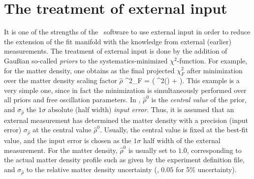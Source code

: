 \section{The treatment of external input}
\label{sec:externalinput}

It is one of the strengths of the \GLOBES\ software to use external input 
in order to reduce the extension of the fit manifold with the knowledge 
from external
(earlier) measurements. The treatment of external input is done by the 
addition of Gau\ss ian so-called {\em priors} to the systematics-minimized 
$\chi^2$-function. For example, for the matter density, one obtains as the 
final projected $\chi^2_F$ after minimization over the matter density
scaling factor  $\hat{\rho}$
\be
 \chi^2_F =  \left( \chi^2(\hat{\rho}) +
  \right).
\label{equ:priors}
\ee
This example is a very simple one, since in fact the
minimization is simultaneously performed over all priors and free oscillation 
parameters. In , $\hat{\rho}^0$ is the {\em central value} of the 
prior, and $\sigma_{\hat{\rho}}$ the $1 \sigma$ absolute (half width) 
{\em input error}. Thus, it is assumed that an external measurement has 
determined the matter density with a precision (input error) 
$\sigma_{\hat{\rho}}$ at the central value $\hat{\rho}^0$. Usually, 
the central value is fixed at the best-fit value, and the input error 
is chosen as the $1 \sigma$ half width of the external measurement. For the matter 
density, $\hat{\rho}^0$  is usually set to $1.0$, corresponding to
the actual matter density profile such as given by the experiment
 definition file, and $\sigma_{\hat{\rho}}$ to the 
relative matter density uncertainty (\eg, $0.05$ for 5\% uncertainty).

